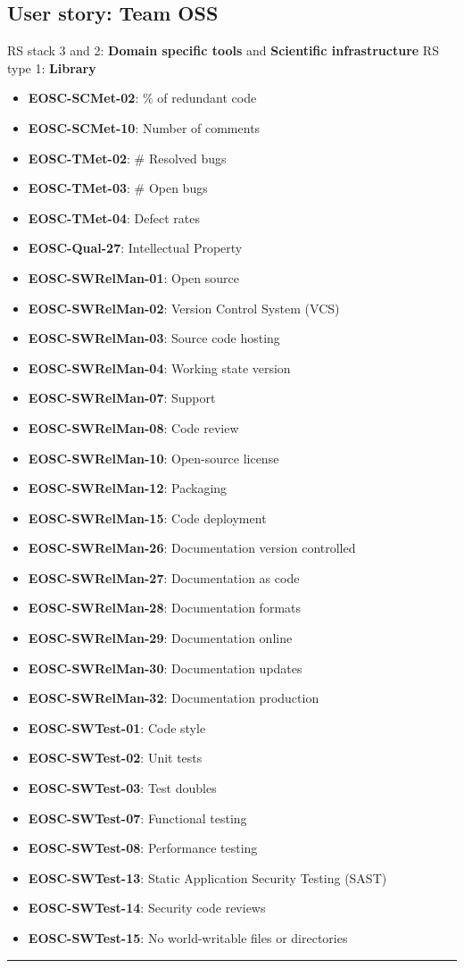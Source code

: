 \subsection{User story: Team OSS}

RS stack 3 and 2: \textbf{Domain specific tools} and  \textbf{Scientific infrastructure} \newline
RS type 1: \textbf{Library}

\begin{itemize}
    \item \textbf{EOSC-SCMet-02}: \% of redundant code
    \item \textbf{EOSC-SCMet-10}: Number of comments
    \item \textbf{EOSC-TMet-02}: \# Resolved bugs
    \item \textbf{EOSC-TMet-03}: \# Open bugs
    \item \textbf{EOSC-TMet-04}: Defect rates
    \item \textbf{EOSC-Qual-27}: Intellectual Property
    \item \textbf{EOSC-SWRelMan-01}: Open source
    \item \textbf{EOSC-SWRelMan-02}: Version Control System (VCS)
    \item \textbf{EOSC-SWRelMan-03}: Source code hosting
    \item \textbf{EOSC-SWRelMan-04}: Working state version
    \item \textbf{EOSC-SWRelMan-07}: Support
    \item \textbf{EOSC-SWRelMan-08}: Code review
    \item \textbf{EOSC-SWRelMan-10}: Open-source license
    \item \textbf{EOSC-SWRelMan-12}: Packaging
    \item \textbf{EOSC-SWRelMan-15}: Code deployment
    \item \textbf{EOSC-SWRelMan-26}: Documentation version controlled
    \item \textbf{EOSC-SWRelMan-27}: Documentation as code
    \item \textbf{EOSC-SWRelMan-28}: Documentation formats
    \item \textbf{EOSC-SWRelMan-29}: Documentation online
    \item \textbf{EOSC-SWRelMan-30}: Documentation updates
    \item \textbf{EOSC-SWRelMan-32}: Documentation production
    \item \textbf{EOSC-SWTest-01}: Code style
    \item \textbf{EOSC-SWTest-02}: Unit tests
    \item \textbf{EOSC-SWTest-03}: Test doubles
    \item \textbf{EOSC-SWTest-07}: Functional testing
    \item \textbf{EOSC-SWTest-08}: Performance testing
    \item \textbf{EOSC-SWTest-13}: Static Application Security Testing (SAST)
    \item \textbf{EOSC-SWTest-14}: Security code reviews
    \item \textbf{EOSC-SWTest-15}: No world-writable files or directories
\end{itemize}
\hrule


